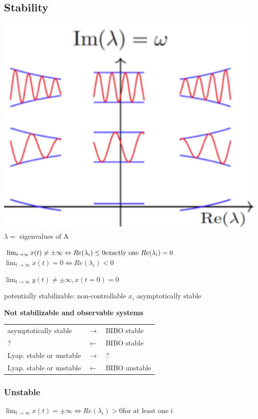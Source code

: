 \subsection{Stability}
    \begin{minipage}{0.39\linewidth}
        \includegraphics[width = \linewidth]{src/images/eigenvalue_response.png}
        $\lambda =$ eigenvalues of A
    \end{minipage}
    \begin{minipage}{0.59\linewidth}
        $\lim_{t \rightarrow \infty} x(t) \neq \pm \infty \Leftrightarrow Re(\lambda_i) \leq 0\\
        \text{exactly one } Re(\lambda_i) = 0$
%
        $\lim_{t \rightarrow \infty} x(t) = 0 \Leftrightarrow Re(\lambda_i) < 0$

        $\lim_{t \rightarrow \infty} y(t) \neq \pm \infty, x(t = 0) = 0$
    \end{minipage}
    potentially stabilizable: non-controllable $x_i$ asymptotically stable

    \begin{center}
        \textbf{Not stabilizable and observable systems}
    \end{center}
    \begin{tabu}{|X[6] X X[3]|}
        \hline
        asymptotically stable & $\rightarrow$ & BIBO stable\\
        ? & $\leftarrow$ & BIBO stable\\
        Lyap. stable or unstable & $\rightarrow$ & ?\\
        Lyap. stable or unstable & $\leftarrow$ & BIBO unstable\\
        \hline
    \end{tabu}

    \subsubsection{Unstable}
    $\lim_{t \rightarrow \infty} x(t) = \pm \infty \Leftrightarrow Re(\lambda_i) > 0 \text{for at least one i}$